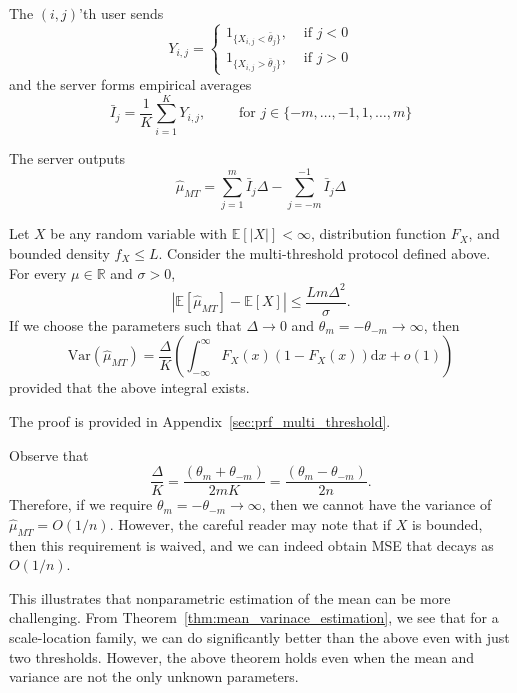 \documentclass[10pt]{article} %
\theoremstyle{plain}
\theoremstyle{definition}
\theoremstyle{remark}
\newcommand{\bE}{\mathbb E}
\newcommand{\bR}{\mathbb R}
\newcommand{\rvar}{\mathrm{Var}}
\newcommand{\dx}{\mathrm{d}}
\begin{document}
The $(i,j)$'th user sends 
\[
Y_{i,j} = \begin{cases}
1_{\{X_{i,j}< \bar{\theta}_j\}},&\text{ if }j<0\\
1_{\{X_{i,j}> \bar{\theta}_j\}},&\text{ if }j>0
\end{cases}
\]
and the server forms empirical averages
\[
\bar{I}_j = \frac{1}{K} \sum_{i=1}^{K} Y_{i,j}, 
\qquad \text{ for }j\in\{-m,\ldots,-1,1,\ldots,m\}
\]

The server outputs
\[
\hat{\mu}_{MT} = \sum_{j=1}^{m} \bar{I}_j\Delta -\sum_{j=-m}^{-1} \bar{I}_j\Delta  \tag{3}
\]

\begin{theorem}
\label{thm:multi-threshold-bias-var-full}
Let $X $ be any random variable with $\bE[|X|] < \infty$, distribution function $F_X$, and bounded density $f_X \le L$.  
Consider the multi-threshold protocol defined above. For every $\mu\in\bR$ and $\sigma>0$,
\[
|\bE[\hat{\mu}_{MT}] - \bE[X]|\leq \frac{Lm\Delta^2}{\sigma}.
\]
If we choose the parameters such that $\Delta\to 0$ and $\theta_m=-\theta_{-m}\to\infty$, then
\[
\rvar(\hat{\mu}_{MT}) = \frac{\Delta}{K} \left(\int_{-\infty}^\infty F_{X}(x)(1-F_{X}(x)) \dx x + o(1)\right)
\]
provided that the above integral exists.
\end{theorem}

The proof is provided in Appendix~\ref{sec:prf_multi_threshold}.

Observe that 
$$\frac{\Delta}{K}=\frac{(\theta_m+\theta_{-m})}{2mK}=\frac{(\theta_m-\theta_{-m})}{2n}.$$
Therefore, if we require $\theta_{m}=-\theta_{-m}\to\infty$, then we cannot have the variance of $\hat{\mu}_{MT}=O(1/n)$.
However, the careful reader may note that if $X$ is bounded, then this requirement is waived, and we can indeed obtain MSE that decays as $O(1/n)$.

This illustrates that nonparametric estimation of the mean can be more challenging. From Theorem~\ref{thm:mean_varinace_estimation}, we see that for a scale-location family, we can do significantly better than the above even with just two thresholds. However, the above theorem holds even when the mean and variance are not the only unknown parameters.
\end{document}
